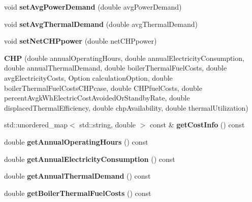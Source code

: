 \begin{DoxyCompactItemize}
\mbox{\label{class_c_h_p_a4f3183df776744f6871fb59b07553d2c}} 
void {\bfseries set\+Avg\+Power\+Demand} (double avg\+Power\+Demand)
\item 
\mbox{\label{class_c_h_p_a0036fd3fc3154adc0fdba0ede8277bee}} 
void {\bfseries set\+Avg\+Thermal\+Demand} (double avg\+Thermal\+Demand)
\item 
\mbox{\label{class_c_h_p_a625efb308ccd22c8bdf75f082ff7bae2}} 
void {\bfseries set\+Net\+C\+H\+Ppower} (double net\+C\+H\+Ppower)
\item 
\mbox{\label{class_c_h_p_aea45a2afd5189214fbf720e53d587640}} 
{\bfseries C\+HP} (double annual\+Operating\+Hours, double annual\+Electricity\+Consumption, double annual\+Thermal\+Demand, double boiler\+Thermal\+Fuel\+Costs, double avg\+Electricity\+Costs, Option calculation\+Option, double boiler\+Thermal\+Fuel\+Costs\+C\+H\+Pcase, double C\+H\+Pfuel\+Costs, double percent\+Avgk\+Wh\+Electric\+Cost\+Avoided\+Or\+Standby\+Rate, double displaced\+Thermal\+Efficiency, double chp\+Availability, double thermal\+Utilization)
\item 
\mbox{\label{class_c_h_p_a9b448b253454087f9e98124aa716715f}} 
std\+::unordered\+\_\+map$<$ std\+::string, double $>$ const  \& {\bfseries get\+Cost\+Info} () const
\item 
\mbox{\label{class_c_h_p_aeeb03f1f40db034babf883a1e00ed2a3}} 
double {\bfseries get\+Annual\+Operating\+Hours} () const
\item 
\mbox{\label{class_c_h_p_a37d544d03c45668a9dc5d502cdcb6137}} 
double {\bfseries get\+Annual\+Electricity\+Consumption} () const
\item 
\mbox{\label{class_c_h_p_a849a576483b92b131ebfc0615e1e0bdb}} 
double {\bfseries get\+Annual\+Thermal\+Demand} () const
\item 
\mbox{\label{class_c_h_p_a9f6c6638b1be7c2df8ba4b406c3b2b94}} 
double {\bfseries get\+Boiler\+Thermal\+Fuel\+Costs} () const
\item 
\mbox{\label{class_c_h_p_a00929ba5d10367258dc1dc437eda88e3}} 

\end{DoxyCompactItemize}

